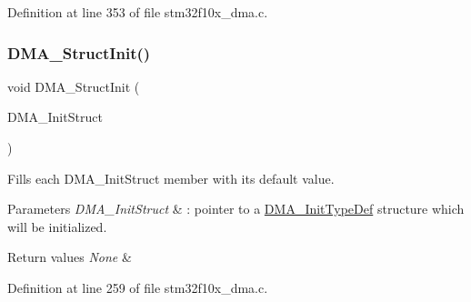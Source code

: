 Definition at line 353 of file stm32f10x\+\_\+dma.\+c.

\mbox{\label{group___d_m_a___private___functions_ga0f7f95f750a90a6824f4e9b6f58adc7e}} 
\subsubsection{\texorpdfstring{D\+M\+A\+\_\+\+Struct\+Init()}{DMA\_StructInit()}}
{\footnotesize\ttfamily void D\+M\+A\+\_\+\+Struct\+Init (\begin{DoxyParamCaption}\item[{\hyperlink{struct_d_m_a___init_type_def}{D\+M\+A\+\_\+\+Init\+Type\+Def} $\ast$}]{D\+M\+A\+\_\+\+Init\+Struct }\end{DoxyParamCaption})}



Fills each D\+M\+A\+\_\+\+Init\+Struct member with its default value. 


\begin{DoxyParams}{Parameters}
{\em D\+M\+A\+\_\+\+Init\+Struct} & \+: pointer to a \hyperlink{struct_d_m_a___init_type_def}{D\+M\+A\+\_\+\+Init\+Type\+Def} structure which will be initialized. \\
\hline
\end{DoxyParams}

\begin{DoxyRetVals}{Return values}
{\em None} & \\
\hline
\end{DoxyRetVals}


Definition at line 259 of file stm32f10x\+\_\+dma.\+c.

